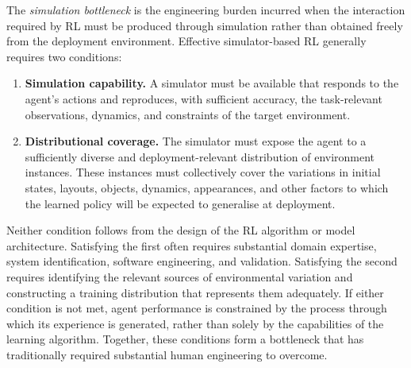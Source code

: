 
\begin{tcolorbox}[
colback=gray!10,
leftrule=0.5mm,
top=3mm,
bottom=3mm,
title={The simulation bottleneck}
]
The \emph{simulation bottleneck} is the engineering burden incurred when the interaction required by RL must be produced through simulation rather than obtained freely from the deployment environment. Effective simulator-based RL generally requires two conditions:
\begin{enumerate}[leftmargin=*]
\item \textbf{Simulation capability.}
A simulator must be available that responds to the agent's actions and reproduces, with sufficient accuracy, the task-relevant observations, dynamics, and constraints of the target environment.

\item \textbf{Distributional coverage.} The simulator must expose the agent to a sufficiently diverse and deployment-relevant distribution of environment instances. These instances must collectively cover the variations in initial states, layouts, objects, dynamics, appearances, and other factors to which the learned policy will be expected to generalise at deployment.
\end{enumerate}

Neither condition follows from the design of the RL algorithm or model architecture. Satisfying the first often requires substantial domain expertise, system identification, software engineering, and validation. Satisfying the second requires identifying the relevant sources of environmental variation and constructing a training distribution that represents them adequately. If either condition is not met, agent performance is constrained by the process through which its experience is generated, rather than solely by the capabilities of the learning algorithm. Together, these conditions form a bottleneck that has traditionally required substantial human engineering to overcome.
\end{tcolorbox}

